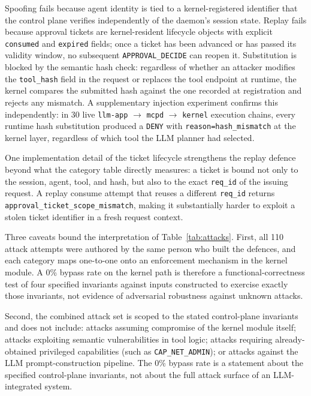Spoofing fails because agent identity is tied to a kernel-registered identifier that the control plane verifies independently of the daemon's session state.
Replay fails because approval tickets are kernel-resident lifecycle objects with explicit \texttt{consumed} and \texttt{expired} fields; once a ticket has been advanced or has passed its validity window, no subsequent \texttt{APPROVAL\_DECIDE} can reopen it.
Substitution is blocked by the semantic hash check: regardless of whether an attacker modifies the \texttt{tool\_hash} field in the request or replaces the tool endpoint at runtime, the kernel compares the submitted hash against the one recorded at registration and rejects any mismatch.
A supplementary injection experiment confirms this independently: in 30 live \texttt{llm-app} $\to$ \texttt{mcpd} $\to$ \texttt{kernel} execution chains, every runtime hash substitution produced a \texttt{DENY} with \texttt{reason=hash\_mismatch} at the kernel layer, regardless of which tool the LLM planner had selected.

One implementation detail of the ticket lifecycle strengthens the replay defence beyond what the category table directly measures: a ticket is bound not only to the session, agent, tool, and hash, but also to the exact \texttt{req\_id} of the issuing request.
A replay consume attempt that reuses a different \texttt{req\_id} returns \texttt{approval\_ticket\_scope\_mismatch}, making it substantially harder to exploit a stolen ticket identifier in a fresh request context.

Three caveats bound the interpretation of Table~\ref{tab:attacks}.
First, all 110 attack attempts were authored by the same person who built the defences, and each category maps one-to-one onto an enforcement mechanism in the kernel module.
A 0\% bypass rate on the kernel path is therefore a functional-correctness test of four specified invariants against inputs constructed to exercise exactly those invariants, not evidence of adversarial robustness against unknown attacks.

Second, the combined attack set is scoped to the stated control-plane invariants and does not include: attacks assuming compromise of the kernel module itself; attacks exploiting semantic vulnerabilities in tool logic; attacks requiring already-obtained privileged capabilities (such as \texttt{CAP\_NET\_ADMIN}); or attacks against the LLM prompt-construction pipeline.
The 0\% bypass rate is a statement about the specified control-plane invariants, not about the full attack surface of an LLM-integrated system.

